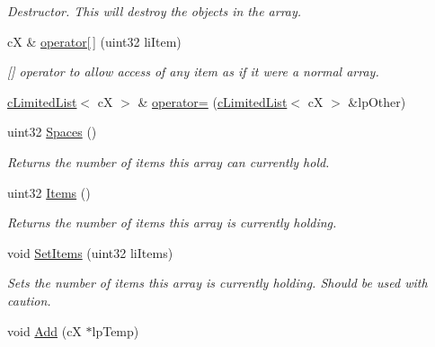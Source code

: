 \begin{DoxyCompactItemize}
\begin{DoxyCompactList}\small\item\em Destructor. This will destroy the objects in the array. \end{DoxyCompactList}\item 
\hypertarget{classc_limited_list_ae11b7c0a82de56c938eaf6d814838048}{
cX \& \hyperlink{classc_limited_list_ae11b7c0a82de56c938eaf6d814838048}{operator\mbox{[}$\,$\mbox{]}} (uint32 liItem)}
\label{classc_limited_list_ae11b7c0a82de56c938eaf6d814838048}

\begin{DoxyCompactList}\small\item\em \mbox{[}\mbox{]} operator to allow access of any item as if it were a normal array. \end{DoxyCompactList}\item 
\hyperlink{classc_limited_list}{cLimitedList}$<$ cX $>$ \& \hyperlink{classc_limited_list_af6efd3116def79b9ca62cccc7ded030f}{operator=} (\hyperlink{classc_limited_list}{cLimitedList}$<$ cX $>$ \&lpOther)
\item 
\hypertarget{classc_limited_list_a6770112af99371bce28636f45c537e87}{
uint32 \hyperlink{classc_limited_list_a6770112af99371bce28636f45c537e87}{Spaces} ()}
\label{classc_limited_list_a6770112af99371bce28636f45c537e87}

\begin{DoxyCompactList}\small\item\em Returns the number of items this array can currently hold. \end{DoxyCompactList}\item 
\hypertarget{classc_limited_list_a0109c9831d7bf20d5ba259fc188be714}{
uint32 \hyperlink{classc_limited_list_a0109c9831d7bf20d5ba259fc188be714}{Items} ()}
\label{classc_limited_list_a0109c9831d7bf20d5ba259fc188be714}

\begin{DoxyCompactList}\small\item\em Returns the number of items this array is currently holding. \end{DoxyCompactList}\item 
\hypertarget{classc_limited_list_a8a01caffbb1d69abf97481f12e59768d}{
void \hyperlink{classc_limited_list_a8a01caffbb1d69abf97481f12e59768d}{SetItems} (uint32 liItems)}
\label{classc_limited_list_a8a01caffbb1d69abf97481f12e59768d}

\begin{DoxyCompactList}\small\item\em Sets the number of items this array is currently holding. Should be used with caution. \end{DoxyCompactList}\item 
\hypertarget{classc_limited_list_a71e9c546a89a1be5cd656cc1284b4475}{
void \hyperlink{classc_limited_list_a71e9c546a89a1be5cd656cc1284b4475}{Add} (cX $\ast$lpTemp)}
\label{classc_limited_list_a71e9c546a89a1be5cd656cc1284b4475}


\end{DoxyCompactItemize}
